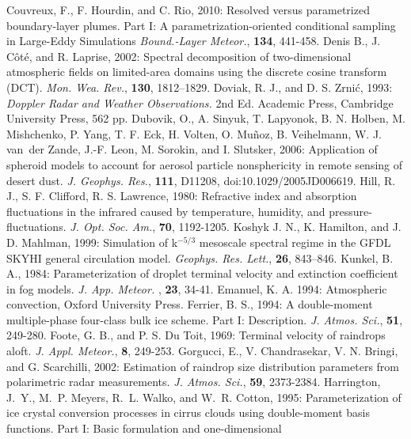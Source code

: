 \decrefname
Couvreux, F., F. Hourdin, and C. Rio, 2010:
      Resolved versus parametrized boundary-layer plumes. Part I: A parametrization-oriented
      conditional sampling in Large-Eddy Simulations
      {\it Bound.-Layer Meteor.},
      {\bf 134},
      441-458.
\decrefname
Denis B., J. C\^{o}t\'{e}, and R. Laprise, 2002: Spectral decomposition of
  two-dimensional atmospheric fields on limited-area domains using the discrete
  cosine transform (DCT). {\em Mon. Wea. Rev.}, {\bf 130}, 1812--1829.
\decrefname
Doviak, R. J., and D. S. Zrni\'c, 1993:
      \textit{Doppler Radar and Weather Observations.}
      2nd Ed.
      Academic Press,
      Cambridge University Press,
      562 pp.
\decrefname
Dubovik, O., A. Sinyuk, T. Lapyonok, B. N. Holben, M. Mishchenko, P. Yang, T. F. Eck,
      H. Volten, O. Mu\~noz, B. Veihelmann, W. J. van~der Zande, J.-F. Leon, M. Sorokin,
      and I. Slutsker, 2006: Application of spheroid models to account for aerosol
      particle nonsphericity in remote sensing of desert dust.
      {\it J. Geophys. Res.}, {\bf 111}, D11208, doi:10.1029/2005JD006619.
\decrefname
Hill, R. J., S. F. Clifford, R. S. Lawrence, 1980:
      Refractive index and absorption fluctuations in the infrared 
      caused by temperature, humidity, and pressure-fluctuations.
      {\it J. Opt. Soc. Am.}, 
      {\bf 70},
      1192-1205.  
\decrefname
Koshyk J. N., K. Hamilton, and J. D. Mahlman, 1999: Simulation of k$^{-5/3}$ mesoscale
  spectral regime in the GFDL SKYHI general circulation model. {\em Geophys.
  Res. Lett.}, {\bf 26}, 843--846.
\decrefname
Kunkel, B. A., 1984: Parameterization of droplet terminal velocity and
extinction coefficient in fog models.
     {\it J. App. Meteor. },
      {\bf 23},
      34-41.     
\decrefname
Emanuel, K. A. 1994: Atmospheric convection, Oxford University Press.
\decrefname
Ferrier, B. S., 1994:
      A double-moment multiple-phase four-class bulk ice scheme.
      Part I: Description.
      {\it J. Atmos. Sci.},
      {\bf 51},
      249-280.
\decrefname
Foote, G. B., and P. S. Du Toit, 1969:
      Terminal velocity of raindrops aloft.
      {\it J. Appl. Meteor.},
      {\bf 8},
      249-253.
\decrefname
Gorgucci, E., V. Chandrasekar, V. N. Bringi, and G. Scarchilli, 2002:
      Estimation of raindrop size distribution parameters from polarimetric
      radar measurements.
      {\it J. Atmos. Sci.},
      {\bf 59},
      2373-2384.
\decrefname
Harrington, J.~Y., M.~P. Meyers, R.~L. Walko, and W.~R. Cotton, 1995:
  Parameterization of ice crystal conversion processes in cirrus clouds using
  double-moment basis functions. Part I: Basic formulation and one-dimensional
